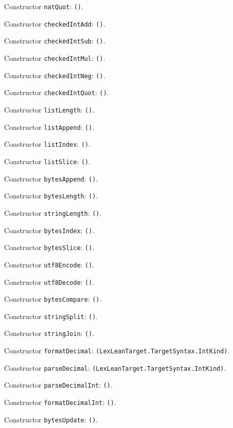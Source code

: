 \documentclass[11pt]{article}
\begin{document}
\noindent Constructor \texttt{natQuot}: \texttt{()}.\par
\noindent Constructor \texttt{checkedIntAdd}: \texttt{()}.\par
\noindent Constructor \texttt{checkedIntSub}: \texttt{()}.\par
\noindent Constructor \texttt{checkedIntMul}: \texttt{()}.\par
\noindent Constructor \texttt{checkedIntNeg}: \texttt{()}.\par
\noindent Constructor \texttt{checkedIntQuot}: \texttt{()}.\par
\noindent Constructor \texttt{listLength}: \texttt{()}.\par
\noindent Constructor \texttt{listAppend}: \texttt{()}.\par
\noindent Constructor \texttt{listIndex}: \texttt{()}.\par
\noindent Constructor \texttt{listSlice}: \texttt{()}.\par
\noindent Constructor \texttt{bytesAppend}: \texttt{()}.\par
\noindent Constructor \texttt{bytesLength}: \texttt{()}.\par
\noindent Constructor \texttt{stringLength}: \texttt{()}.\par
\noindent Constructor \texttt{bytesIndex}: \texttt{()}.\par
\noindent Constructor \texttt{bytesSlice}: \texttt{()}.\par
\noindent Constructor \texttt{utf8Encode}: \texttt{()}.\par
\noindent Constructor \texttt{utf8Decode}: \texttt{()}.\par
\noindent Constructor \texttt{bytesCompare}: \texttt{()}.\par
\noindent Constructor \texttt{stringSplit}: \texttt{()}.\par
\noindent Constructor \texttt{stringJoin}: \texttt{()}.\par
\noindent Constructor \texttt{formatDecimal}: \texttt{(LexLeanTarget.TargetSyntax.IntKind)}.\par
\noindent Constructor \texttt{parseDecimal}: \texttt{(LexLeanTarget.TargetSyntax.IntKind)}.\par
\noindent Constructor \texttt{parseDecimalInt}: \texttt{()}.\par
\noindent Constructor \texttt{formatDecimalInt}: \texttt{()}.\par
\noindent Constructor \texttt{bytesUpdate}: \texttt{()}.\par
\end{document}
